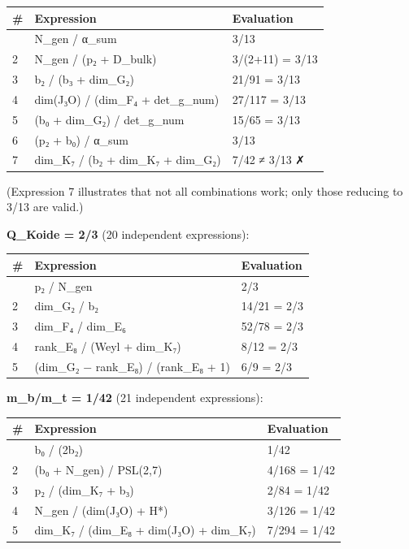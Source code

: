 \documentclass[11pt,a4paper]{article}
\begin{document}
{\def\LTcaptype{none} %
\begin{longtable}[]{@{}lll@{}}
\toprule\noalign{}
\# & Expression & Evaluation \\
\midrule\noalign{}
\endhead
\bottomrule\noalign{}
\endlastfoot
1 & N\_gen / α\_sum & 3/13 \\
2 & N\_gen / (p₂ + D\_bulk) & 3/(2+11) = 3/13 \\
3 & b₂ / (b₃ + dim\_G₂) & 21/91 = 3/13 \\
4 & dim(J₃O) / (dim\_F₄ + det\_g\_num) & 27/117 = 3/13 \\
5 & (b₀ + dim\_G₂) / det\_g\_num & 15/65 = 3/13 \\
6 & (p₂ + b₀) / α\_sum & 3/13 \\
7 & dim\_K₇ / (b₂ + dim\_K₇ + dim\_G₂) & 7/42 ≠ 3/13 ✗ \\
\end{longtable}
}

(Expression 7 illustrates that not all combinations work; only those reducing to 3/13 are valid.)

\textbf{Q\_Koide = 2/3} (20 independent expressions):

{\def\LTcaptype{none} %
\begin{longtable}[]{@{}lll@{}}
\toprule\noalign{}
\# & Expression & Evaluation \\
\midrule\noalign{}
\endhead
\bottomrule\noalign{}
\endlastfoot
1 & p₂ / N\_gen & 2/3 \\
2 & dim\_G₂ / b₂ & 14/21 = 2/3 \\
3 & dim\_F₄ / dim\_E₆ & 52/78 = 2/3 \\
4 & rank\_E₈ / (Weyl + dim\_K₇) & 8/12 = 2/3 \\
5 & (dim\_G₂ − rank\_E₈) / (rank\_E₈ + 1) & 6/9 = 2/3 \\
\end{longtable}
}

\textbf{m\_b/m\_t = 1/42} (21 independent expressions):

{\def\LTcaptype{none} %
\begin{longtable}[]{@{}lll@{}}
\toprule\noalign{}
\# & Expression & Evaluation \\
\midrule\noalign{}
\endhead
\bottomrule\noalign{}
\endlastfoot
1 & b₀ / (2b₂) & 1/42 \\
2 & (b₀ + N\_gen) / PSL(2,7) & 4/168 = 1/42 \\
3 & p₂ / (dim\_K₇ + b₃) & 2/84 = 1/42 \\
4 & N\_gen / (dim(J₃O) + H*) & 3/126 = 1/42 \\
5 & dim\_K₇ / (dim\_E₈ + dim(J₃O) + dim\_K₇) & 7/294 = 1/42 \\
\end{longtable}
}
\end{document}

